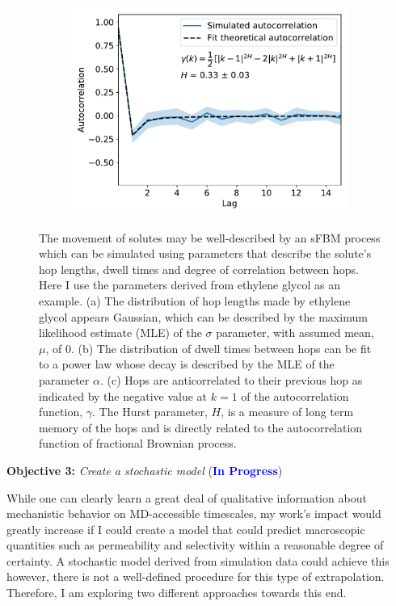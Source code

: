 \documentclass{article}
\begin{document}
\begin{figure}[h!]
\begin{subfigure}{0.325\textwidth}
  \includegraphics[width=\linewidth]{hop_acf_GCL.pdf}
  \caption{}\label{fig:hop_acf}
  \end{subfigure}
  \caption{The movement of solutes may be well-described by an sFBM process 
  which can be simulated using parameters that describe the solute's hop lengths, 
  dwell times and degree of correlation between hops. Here I use the parameters 
  derived from ethylene glycol as an example. (a) The distribution of hop
  lengths made by ethylene glycol appears Gaussian, which can be described by the
  maximum likelihood estimate (MLE) of the $\sigma$ parameter, with assumed mean, 
  $\mu$, of 0. (b) The distribution of dwell times between hops can be fit to a 
  power law whose decay is described by the MLE of the parameter $\alpha$. 
  (c) Hops are anticorrelated to their previous hop as indicated by the negative
  value at $k=1$ of the autocorrelation function, $\gamma$. The Hurst 
  parameter, $H$, is a measure of long term memory of the hops and is directly
  related to the autocorrelation function of fractional Brownian process.}\label{fig:distributions}
  \end{figure}
  
  \noindent \textbf{\large Objective 3:} \textit{\large Create a stochastic model} (\textcolor{blue}{\textbf{In Progress}})
  
  While one can clearly learn a great deal of qualitative information about 
  mechanistic behavior on MD-accessible timescales, my work's impact would
  greatly increase if I could create a model that could predict macroscopic
  quantities such as permeability and selectivity within a reasonable degree
  of certainty. A stochastic model derived from simulation data could achieve 
  this however, there is not a well-defined procedure for this type of 
  extrapolation. Therefore, I am exploring two different approaches towards
  this end. 
\end{document}
